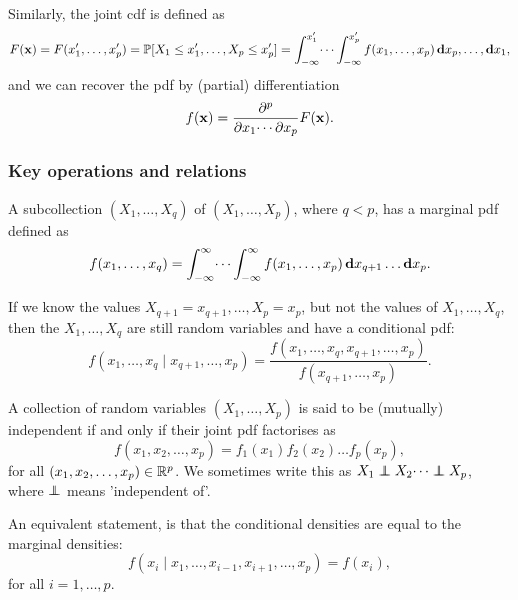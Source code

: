 \documentclass[10pt, a4paper]{article}
\begin{document}
\begin{definition}
    Similarly,
    the joint cdf is defined as
    \[
    F(\mathbf{x}) = F(x_1', \dotsc, x_p') = \mathbb{P}[X_1 \leq x_1', \dotsc, X_p \leq x_p'] = \int_{-\infty}^{x_1'}\dotsi\int_{-\infty}^{x_p'}f(x_1, \dotsc, x_p)\,\mathbf{d}x_p, \dotsc, \mathbf{d}x_1,
    \]
    and we can recover the pdf by
    (partial)
    differentiation
    \[
    f(\mathbf{x}) = \frac{\partial ^ p}{\partial x_1\dotsi\partial x_p}F(\mathbf{x}).
    \]
\end{definition}

\subsubsection{Key operations and relations}

\begin{definition}
    A subcollection $(X_1, \dotsc, X_q)$ of $(X_1, \dotsc, X_p)$,
    where $q < p$,
    has a marginal pdf defined as
    \[
    f(x_1, \dotsc, x_q) = \int_{-\infty}^{\infty}\dotsi\int_{-\infty}^{\infty}f(x_1, \dotsc, x_p)\,\mathbf{d}x_{q + 1}\dotsc\mathbf{d}x_p.
    \]
\end{definition}

\begin{definition}
    If we know the values $X_{q + 1} = x_{q + 1}, \dotsc, X_p = x_p$,
    but not the values of $X_1, \dotsc, X_q$,
    then the $X_1, \dotsc, X_q$ are still random variables and have a conditional pdf:
    \[
    f(x_1, \dotsc, x_q\mid x_{q + 1}, \dotsc, x_p) = \frac{f(x_1, \dotsc, x_q, x_{q + 1}, \dotsc, x_p)}{f(x_{q + 1}, \dotsc, x_p)}.
    \]
\end{definition}

\begin{definition}[Independence]
    A collection of random variables $(X_1, \dotsc, X_p)$ is said to be
    (mutually)
    independent if and only if their joint pdf factorises as
    \[
    f(x_1, x_2, \dotsc, x_p) = f_1(x_1)f_2(x_2)\dotsc f_p(x_p),
    \]
    for all $(x_1, x_2, \dotsc, x_p) \in \mathbb{R} ^ p$.
    We sometimes write this as $X_1 \independent X_2 \dotsi \independent X_p$,
    where $\independent$ means 'independent of'.

    An equivalent statement,
    is that the conditional densities are equal to the marginal densities:
    \[
    f(x_i\mid x_1, \dotsc, x_{i - 1}, x_{i + 1}, \dotsc, x_p) = f(x_i),
    \]
    for all $i = 1, \dotsc, p$.
\end{definition}
\end{document}
